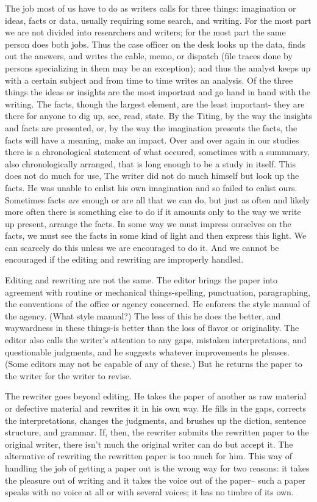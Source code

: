 \documentclass[
    oneside,
    11pt,
]{memoir}
\begin{document}
The job most of us have to do as writers calls for three things: imagination or ideas, facts or data, usually requiring some search, and writing. For the most part we are not divided into researchers and writers; for the most part the same person does both jobs. Thus the case officer on the desk looks up the data, finds out the answers, and writes the cable, memo, or dispatch (file traces done by persons specializing in them may be an exception); and thus the analyst keeps up with a certain subject and from time to time writes an analysis. Of the three things the ideas or insights are the most important and go hand in hand with the writing. The facts, though the largest element, are the least important- they are there for anyone to dig up, see, read, state. By the Titing, by the way the insights and facts are presented, or, by the way the imagination presents the facts, the facts will have a meaning, make an impact. Over and over again in our studies there is a chronological statement of what occured, sometimes with a summmary, also chronologically arranged, that is long enough to be a study in itself. This does not do much for use, The writer did not do much himself but look up the facts. He was unable to enlist his own imagination and so failed to enlist ours. Sometimes facts \emph{are} enough or are all that we can do, but just as often and likely more often there is something else to do if it amounts only to the way we write up present, arrange the facts. In some way we must impress ourselves on the facts, we must see the facts in some kind of light and then express this light. We can scarcely do this unless we are encouraged to do it. And we cannot be encouraged if the editing and rewriting are improperly handled. 

Editing and rewriting are not the same. The editor brings the paper into agreement with routine or mechanical things-spelling, punctuation, paragraphing, the conventions of the office or agency concerned. He enforces the style manual of the agency. (What style manual?) The less of this he does the better, and waywardness in these things-is better than the loss of flavor or originality. The editor also calls the writer's attention to any gaps, mistaken interpretations, and questionable judgments, and he suggests whatever improvements he pleases. (Some editors may not be capable of any of these.) But he returns the paper to the writer for the writer to revise. 

The rewriter goes beyond editing. He takes the paper of another as raw material or defective material and rewrites it in his own way. He fills in the gaps, corrects the interpretations, changes the judgments, and brushes up the diction, sentence structure, and grammar. If, then, the rewriter submits the rewritten paper to the original writer, there isn't much the original writer can do but accept it. The alternative of rewriting the rewritten paper is too much for him. This way of handling the job of getting a paper out is the wrong way for two reasons: it takes the pleasure out of writing and it takes the voice out of the paper-- such a paper speaks with no voice at all or with several voices; it has no timbre of its own.
\end{document}
